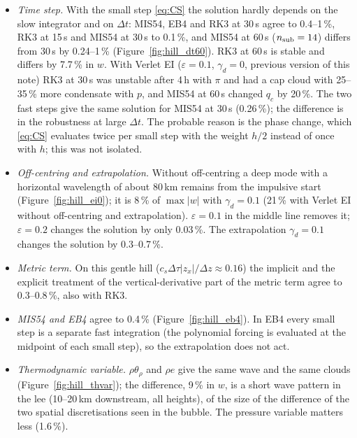 \documentclass[11pt,a4paper]{article}
\newcommand{\dtau}{\Delta\tau}
\newcommand{\dt}{\Delta t}
\begin{document}
\begin{itemize}
\item \emph{Time step.} With the small step \eqref{eq:CS} the solution hardly depends on the slow integrator and on
$\dt$: MIS54, EB4 and RK3 at 30\,s agree to 0.4--1\,\%, RK3 at 15\,s and MIS54 at 30\,s to 0.1\,\%, and MIS54 at 60\,s
($n_{\rm sub}=14$) differs from 30\,s by 0.24--1\,\% (Figure~\ref{fig:hill_dt60}). RK3 at 60\,s is stable and differs by 7.7\,\% in
$w$. With Verlet EI ($\varepsilon=0.1$, $\gamma_d=0$, previous version of this note) RK3 at 30\,s was unstable after 4\,h with $\pi$ and
had a cap cloud with 25--35\,\% more condensate with $p$, and MIS54 at 60\,s changed $q_c$ by 20\,\%. The two
fast steps give the same solution for MIS54 at 30\,s (0.26\,\%); the difference is in the robustness at large
$\dt$. The probable reason is the phase change, which \eqref{eq:CS} evaluates twice per small step with the
weight $h/2$ instead of once with $h$; this was not isolated.
\item \emph{Off-centring and extrapolation.} Without off-centring a deep mode with a horizontal wavelength of
about 80\,km remains from the impulsive start (Figure~\ref{fig:hill_ei0}); it is 8\,\% of $\max|w|$ with $\gamma_d=0.1$ (21\,\% with
Verlet EI without off-centring and extrapolation). $\varepsilon=0.1$ in the middle line removes it; $\varepsilon=0.2$ changes the
solution by only 0.03\,\%. The extrapolation $\gamma_d=0.1$ changes the solution by 0.3--0.7\,\%.
\item \emph{Metric term.} On this gentle hill ($c_s\dtau|z_x|/\Delta z\approx0.16$) the implicit and the explicit
treatment of the vertical-derivative part of the metric term agree to 0.3--0.8\,\%, also with RK3.
\item \emph{MIS54 and EB4} agree to 0.4\,\% (Figure~\ref{fig:hill_eb4}). In EB4 every small step is a separate fast
integration (the polynomial forcing is evaluated at the midpoint of each small step), so the extrapolation
does not act.
\item \emph{Thermodynamic variable.} $\rho\theta_\rho$ and $\rho e$ give the same wave and the same clouds
(Figure~\ref{fig:hill_thvar}); the difference, 9\,\% in $w$, is a short wave pattern in the lee (10--20\,km
downstream, all heights), of the size of the difference of the two spatial discretisations seen in the
bubble. The pressure variable matters less (1.6\,\%).
\end{itemize}
\end{document}
